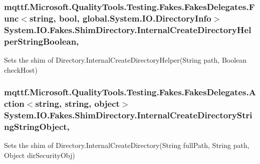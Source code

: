 \hypertarget{class_system_1_1_i_o_1_1_fakes_1_1_shim_directory_a1b54fa78b32ad43d1591e50da7a58903}{
\subsubsection[{Internal\-Create\-Directory\-Helper\-String\-Boolean}]{\setlength{\rightskip}{0pt plus 5cm}mqttf.\-Microsoft.\-Quality\-Tools.\-Testing.\-Fakes.\-Fakes\-Delegates.\-Func$<$string, bool, global.\-System.\-I\-O.\-Directory\-Info$>$ System.\-I\-O.\-Fakes.\-Shim\-Directory.\-Internal\-Create\-Directory\-Helper\-String\-Boolean\hspace{0.3cm}{\ttfamily [static]}, {\ttfamily [set]}}}\label{class_system_1_1_i_o_1_1_fakes_1_1_shim_directory_a1b54fa78b32ad43d1591e50da7a58903}


Sets the shim of Directory.\-Internal\-Create\-Directory\-Helper(\-String path, Boolean check\-Host)

\hypertarget{class_system_1_1_i_o_1_1_fakes_1_1_shim_directory_a1d52fb2e1003fc531bfb3a0a2068ee6e}{
\subsubsection[{Internal\-Create\-Directory\-String\-String\-Object}]{\setlength{\rightskip}{0pt plus 5cm}mqttf.\-Microsoft.\-Quality\-Tools.\-Testing.\-Fakes.\-Fakes\-Delegates.\-Action$<$string, string, object$>$ System.\-I\-O.\-Fakes.\-Shim\-Directory.\-Internal\-Create\-Directory\-String\-String\-Object\hspace{0.3cm}{\ttfamily [static]}, {\ttfamily [set]}}}\label{class_system_1_1_i_o_1_1_fakes_1_1_shim_directory_a1d52fb2e1003fc531bfb3a0a2068ee6e}


Sets the shim of Directory.\-Internal\-Create\-Directory(\-String full\-Path, String path, Object dir\-Security\-Obj)

